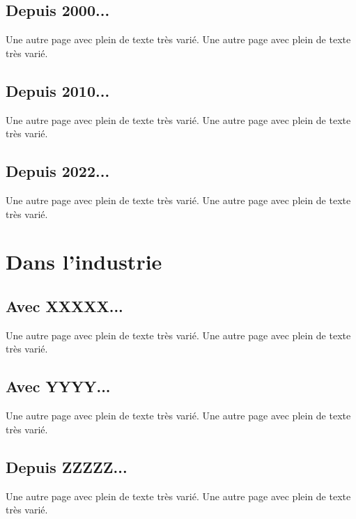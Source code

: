         \section{Depuis 2000...}
            Une autre page avec plein de texte très varié.
            Une autre page avec plein de texte très varié.

        \section{Depuis 2010...}
            Une autre page avec plein de texte très varié.
            Une autre page avec plein de texte très varié.

        \section{Depuis 2022...}
            Une autre page avec plein de texte très varié.
            Une autre page avec plein de texte très varié.

    \chapter{Dans l'industrie}

        \section{Avec XXXXX...}
            Une autre page avec plein de texte très varié.
            Une autre page avec plein de texte très varié.

        \section{Avec YYYY...}
            Une autre page avec plein de texte très varié.
            Une autre page avec plein de texte très varié.

        \section{Depuis ZZZZZ...}
            Une autre page avec plein de texte très varié.
            Une autre page avec plein de texte très varié.